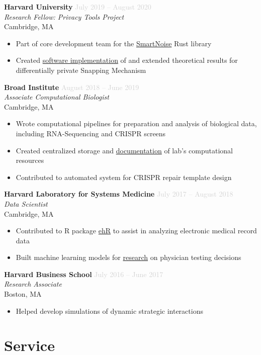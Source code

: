 \documentclass[11pt,a4paper]{article}
\newcommand{\cvitem}[4]{
    \noindent\textbf{#1} \hfill \textcolor{lightgray}{#2} \\
    \textit{#3} \\
    #4 \vspace{6pt}
}
\begin{document}
\cvitem{Harvard University}{July 2019 -- August 2020}{Research Fellow: Privacy Tools Project}{
    Cambridge, MA
    \begin{itemize}
        \item Part of core development team for the \href{https://github.com/opendifferentialprivacy/smartnoise-core}{SmartNoise} Rust library
        \item Created \href{https://github.com/ctcovington/floating_point}{software implementation} of and extended theoretical results for differentially private Snapping Mechanism
    \end{itemize}
}

\cvitem{Broad Institute}{August 2018 -- June 2019}{Associate Computational Biologist}{
    Cambridge, MA
    \begin{itemize}
        \item Wrote computational pipelines for preparation and analysis of biological data, including RNA-Sequencing and CRISPR screens
        \item Created centralized storage and \href{https://xavier-lab.readthedocs.io/en/master/?}{documentation} of lab's computational resources
        \item Contributed to automated system for CRISPR repair template design
    \end{itemize}
}

\cvitem{Harvard Laboratory for Systems Medicine}{July 2017 -- August 2018}{Data Scientist}{
    Cambridge, MA
    \begin{itemize}
        \item Contributed to R package \href{https://github.com/sysmedlab/ehR}{ehR} to assist in analyzing electronic medical record data
        \item Built machine learning models for \href{https://eml.berkeley.edu/~webfac/auerbach/w26168.pdf}{research} on physician testing decisions
    \end{itemize}
}

\cvitem{Harvard Business School}{July 2016 -- June 2017}{Research Associate}{
    Boston, MA
    \begin{itemize}
        \item Helped develop simulations of dynamic strategic interactions
    \end{itemize}
}

\section{Service}
\end{document}
